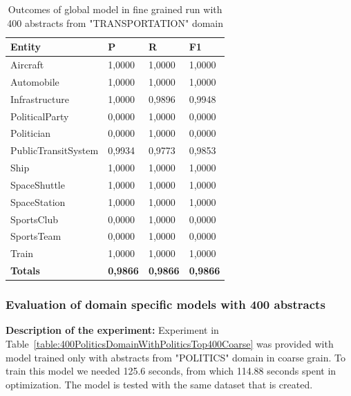 \documentclass[thesis=M,english]{FITthesis}[2018/05/30]
\begin{document}
	\begin{table}[H]\centering
		\begin{tabular}{|l|l|l|l|}
			\hline {\textbf{Entity}} & {\textbf{P}} & {\textbf{R}} & {\textbf{F1}}\\\hline
				Aircraft & 1,0000 & 1,0000 & 1,0000\\
				Automobile & 1,0000 & 1,0000 & 1,0000\\				
				Infrastructure & 1,0000 & 0,9896 & 0,9948\\
				PoliticalParty & 0,0000 & 1,0000 & 0,0000\\				
				Politician & 0,0000 & 1,0000 & 0,0000\\				
				PublicTransitSystem & 0,9934 & 0,9773 & 0,9853\\
				Ship & 1,0000 & 1,0000 & 1,0000\\				
				SpaceShuttle & 1,0000 & 1,0000 & 1,0000\\
				SpaceStation & 1,0000 & 1,0000 & 1,0000\\
				SportsClub & 0,0000 & 1,0000 & 0,0000\\
				SportsTeam & 0,0000 & 1,0000 & 0,0000\\
				Train & 1,0000 & 1,0000 & 1,0000\\\hline
				\textbf{Totals} & \textbf{0,9866} & \textbf{0,9866} & \textbf{0,9866}\\\hline
		\end{tabular}
		\caption{Outcomes of global model in fine grained run with 400 abstracts from "TRANSPORTATION" domain \label{table:400GlobalDomainWithTransportationTop400Fine}}
	\end{table}		
	

\subsubsection{Evaluation of domain specific models with 400 abstracts}

\textbf{Description of the experiment:} Experiment in Table~\ref{table:400PoliticsDomainWithPoliticsTop400Coarse} was provided with model trained only with abstracts from "POLITICS" domain in coarse grain. To train this model we needed 125.6 seconds, from which 114.88 seconds spent in optimization. The model is tested with the same dataset that is created.
\end{document}
